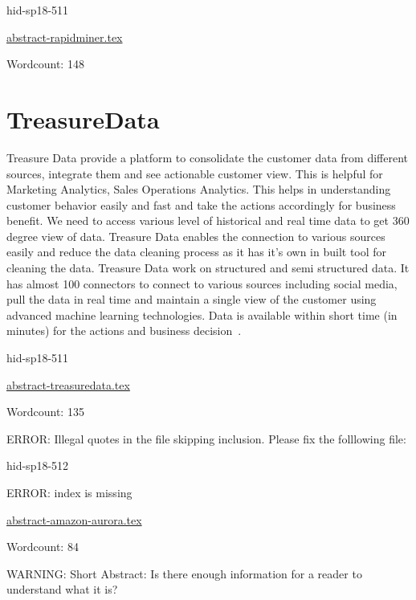 \begin{IU}

hid-sp18-511

\href{https://github.com/cloudmesh-community/hid-sp18-511/blob/master//technology/abstract-rapidminer.tex}{abstract-rapidminer.tex}

 

Wordcount: 148

\end{IU}

\section{TreasureData}

Treasure Data provide a platform to consolidate the customer data from
different sources, integrate them and see actionable customer view.
This is helpful for Marketing Analytics, Sales Operations Analytics.
This helps in understanding customer behavior easily and fast and take
the actions accordingly for business benefit. We need to access
various level of historical and real time data to get 360 degree view
of data. Treasure Data enables the connection to various sources
easily and reduce the data cleaning process as it
has it's own in built tool for cleaning the data. Treasure Data work
on structured and semi structured data. It has almost 100 connectors
to connect to various sources including social media, pull the data in
real time and maintain a single view of the customer using advanced
machine learning technologies. Data is available within short time (in
minutes) for the actions and business
decision~\cite{hid-sp18-511-treasuredata}.


\begin{IU}

hid-sp18-511

\href{https://github.com/cloudmesh-community/hid-sp18-511/blob/master//technology/abstract-treasuredata.tex}{abstract-treasuredata.tex}

 

Wordcount: 135

\end{IU}

ERROR: Illegal quotes in the file skipping inclusion. Please fix the folllowing file:

\begin{IU}

hid-sp18-512

ERROR: index is missing

\href{https://github.com/cloudmesh-community/hid-sp18-512/blob/master//technology/abstract-amazon-aurora.tex}{abstract-amazon-aurora.tex}

 

Wordcount: 84

WARNING: Short Abstract: Is there enough information for a reader to understand what it is?

\end{IU}

